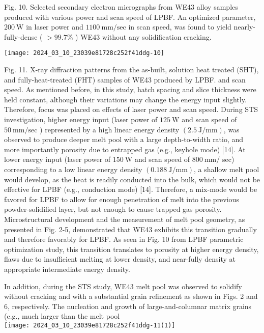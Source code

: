 \documentclass[10pt]{article}
\begin{document}
Fig. 10. Selected secondary electron micrographs from WE43 alloy samples produced with various power and scan speed of LPBF. An optimized parameter, $200 \mathrm{~W}$ in laser power and $1100 \mathrm{~mm} / \mathrm{sec}$ in scan speed, was found to yield nearly-fully-dense ( $>99.7 \%$ ) WE43 without any solidification cracking.

\begin{center}
\texttt{[image: 2024\_03\_10\_23039e81728c252f41ddg-10]}
\end{center}

Fig. 11. X-ray diffraction patterns from the as-built, solution heat treated (SHT), and fully-heat-treated (FHT) samples of WE43 produced by LPBF. and scan speed. As mentioned before, in this study, hatch spacing and slice thickness were held constant, although their variations may change the energy input slightly. Therefore, focus was placed on effects of laser power and scan speed. During STS investigation, higher energy input (laser power of $125 \mathrm{~W}$ and scan speed of $50 \mathrm{~mm} / \mathrm{sec}$ ) represented by a high linear energy density $(2.5 \mathrm{~J} / \mathrm{mm})$, was observed to produce deeper melt pool with a large depth-to-width ratio, and more importantly porosity due to entrapped gas (e.g., keyhole mode) [14]. At lower energy input (laser power of $150 \mathrm{~W}$ and scan speed of $800 \mathrm{~mm} /$ sec) corresponding to a low linear energy density $(0.188 \mathrm{~J} / \mathrm{mm})$, a shallow melt pool would develop, as the heat is readily conducted into the bulk, which would not be effective for LPBF (e.g., conduction mode) [14]. Therefore, a mix-mode would be favored for LPBF to allow for enough penetration of melt into the previous powder-solidified layer, but not enough to cause trapped gas porosity. Microstructural development and the measurement of melt pool geometry, as presented in Fig. 2-5, demonstrated that WE43 exhibits this transition gradually and therefore favorably for LPBF. As seen in Fig. 10 from LPBF parametric optimization study, this transition translates to porosity at higher energy density, flaws due to insufficient melting at lower density, and near-fully density at appropriate intermediate energy density.

In addition, during the STS study, WE43 melt pool was observed to solidify without cracking and with a substantial grain refinement as shown in Figs. 2 and 6, respectively. The nucleation and growth of large-and-columnar matrix grains (e.g., much larger than the melt pool\\
\texttt{[image: 2024\_03\_10\_23039e81728c252f41ddg-11(1)]}
\end{document}
